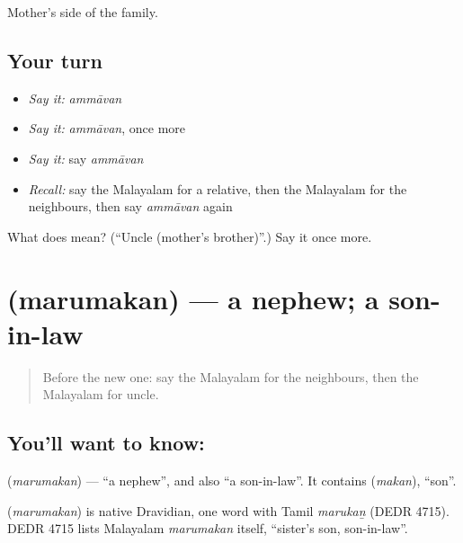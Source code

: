\begin{grammarlens}[title={What you've built}]
Mother's side of the family.
\end{grammarlens}

\subsection*{Your turn}
\begin{itemize}
\raggedright
  \item \emph{Say it:} \emph{ammāvan}
  \item \emph{Say it:} \emph{ammāvan}, once more
  \item \emph{Say it:} say \emph{ammāvan}
  \item \emph{Recall:} say the Malayalam for a relative, then the Malayalam for the neighbours, then say \emph{ammāvan} again
\end{itemize}

\begin{tcolorbox}[breakable,colback=teal!4,colframe=teal!35!black,title={Before you move on}]
What does  mean? (\textquotedblleft{}Uncle (mother's brother)\textquotedblright{}.) Say it once more.
\end{tcolorbox}
\section[\texorpdfstring{\ml{മരുമകൻ} (marumakan)}{മരുമകൻ (marumakan)}]{ (marumakan) — a nephew; a son-in-law}

\label{lesson:ML-C125-nephew}



\begin{quote}
Before the new one: say the Malayalam for the neighbours, then the Malayalam for uncle.
\end{quote}

\subsection*{You'll want to know: }
\textbf{} (\emph{marumakan}) — \textquotedblleft{}a nephew\textquotedblright{}, and also \textquotedblleft{}a son-in-law\textquotedblright{}. It contains \textbf{} (\emph{makan}), \textquotedblleft{}son\textquotedblright{}.

\begin{cousinweb}
\textbf{} (\emph{marumakan}) is native Dravidian, one word with Tamil \emph{marukaṉ} (DEDR 4715). DEDR 4715 lists Malayalam \emph{marumakan} itself, \textquotedblleft{}sister's son, son-in-law\textquotedblright{}.
\end{cousinweb}

